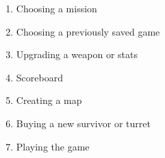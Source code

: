 \documentclass[oneside]{article}%
\begin{document}
\begin{enumerate}
	\item Choosing a mission
	\item Choosing a previously saved game
	\item Upgrading a weapon or stats
	\item Scoreboard
	\item Creating a map
	\item Buying a new survivor or turret
	\item Playing the game
\end{enumerate}

%

\end{document}
